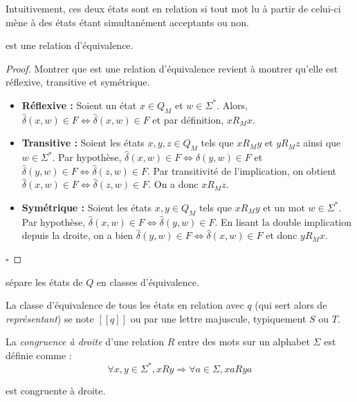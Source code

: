 	 Intuitivement, ces deux états sont en relation si tout mot lu à partir de celui-ci mène à des états étant simultanément acceptants ou non. 
	 
	 \begin{proposition}
	 	\rm est une relation d'équivalence.
	 \end{proposition}
	
	 \begin{proof} Montrer que \rm est une relation d'équivalence revient à montrer qu'elle est réflexive, transitive et symétrique.
	 	\begin{itemize}
	 		\item \textbf{Réflexive :} Soient un état $x \in Q_M$ et $w \in \Sigma^*$. Alors, $\hat{\delta}(x,w) \in F \iff \hat{\delta}(x,w) \in F$ et par définition, $xR_Mx$.
	 		\item \textbf{Transitive :} Soient les états $x,y,z \in Q_M$ tels que $xR_My$ et $yR_Mz$ ainsi que $w \in \Sigma^*$. Par hypothèse, $\hat{\delta}(x,w) \in F \iff \hat{\delta}(y,w)\in F$ et $\hat{\delta}(y,w) \in F\iff \hat{\delta}(z,w) \in F$. Par transitivité de l'implication, on obtient $\hat{\delta}(x,w) \in F \iff \hat{\delta}(z,w)\in F$. On a donc $xR_Mz$.
	 		\item \textbf{Symétrique : } Soient les états $x,y \in Q_M$ tels que $xR_My$ et un mot $w \in \Sigma^*$. Par hypothèse, $\hat{\delta}(x, w)\in F \iff \hat{\delta}(y, w)\in F$. En lisant la double implication depuis la droite, on a bien $\hat{\delta}(y, w) \in F\iff \hat{\delta}(x, w)\in F$ et donc $yR_Mx$.
	 	\end{itemize}
 		\hfill$\square$
	 \end{proof}
	 
	 \begin{corollary}
	 	\rm sépare les états de $Q$ en classes d'équivalence.
	 \end{corollary}
	 
	 La classe d'équivalence de tous les états en relation \rm avec $q$ (qui sert alors de \emph{représentant}) se note $[[q]]$ ou par une lettre majuscule, typiquement $S$ ou $T$.
	 
	 La \emph{congruence à droite} d'une relation $R$ entre des mots sur un alphabet $\Sigma$ est définie comme :
	 $$
	 \forall x,y \in \Sigma^*, xRy \Rightarrow \forall a \in \Sigma, xaRya 
	 $$  
	 
	 \begin{proposition}
	 	\rm est congruente à droite.
	 \end{proposition}
	 
